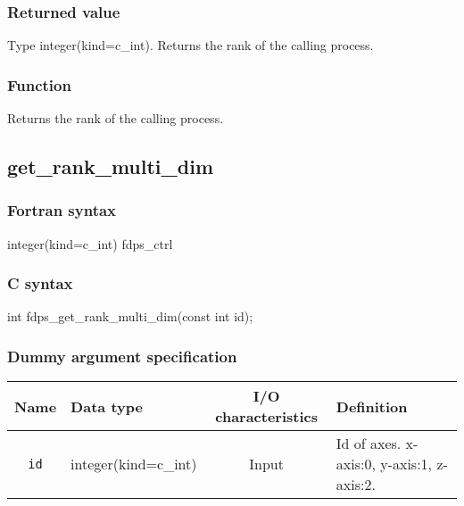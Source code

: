 \subsubsection*{Returned value}
Type integer(kind=c\_int). Returns the rank of the calling process.

\subsubsection*{Function}
Returns the rank of the calling process.
\clearpage

\subsection{get\_rank\_multi\_dim}
\subsubsection*{Fortran syntax}
\begin{screen}
\begin{spverbatim}  
integer(kind=c_int) fdps_ctrl%
\end{spverbatim}
\end{screen}

\subsubsection*{C syntax}
\begin{screen}
\begin{spverbatim}  
int fdps_get_rank_multi_dim(const int id);
\end{spverbatim}
\end{screen}

\subsubsection*{Dummy argument specification}
\begin{table}[h]
\begin{tabularx}{\linewidth}{cXcX}
\toprule
\rowcolor{Snow2}
Name & Data type & I/O characteristics & Definition \\
\midrule
\verb|id| & integer(kind=c\_int) & Input & Id of axes. x-axis:0, y-axis:1, z-axis:2.\\
\bottomrule
\end{tabularx}
\end{table}


